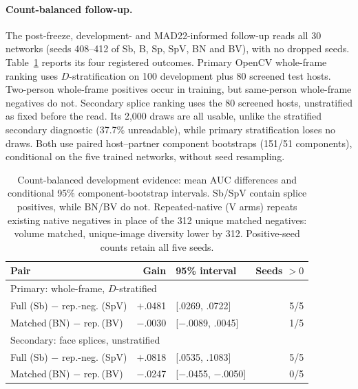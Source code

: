     
    \paragraph{Count-balanced follow-up.}
    The post-freeze, development- and MAD22-informed follow-up reads all 30 networks (seeds 408--412 of Sb, B, Sp, SpV, BN and BV), with no dropped seeds. Table~\ref{tab:count_balanced} reports its four registered outcomes. Primary OpenCV whole-frame ranking uses $D$-stratification on 100 development plus 80 screened test hosts. Two-person whole-frame positives occur in training, but same-person whole-frame negatives do not. Secondary splice ranking uses the 80 screened hosts, unstratified as fixed before the read. Its 2,000 draws are all usable, unlike the stratified secondary diagnostic (37.7\% unreadable), while primary stratification loses no draws. Both use paired host--partner component bootstraps (151/51 components), conditional on the five trained networks, without seed resampling.
    
    \begin{table}[t]
    \centering\small
    \caption{Count-balanced development evidence: mean AUC differences and conditional 95\% component-bootstrap intervals. Sb/SpV contain splice positives, while BN/BV do not. Repeated-native (V arms) repeats existing native negatives in place of the 312 unique matched negatives: volume matched, unique-image diversity lower by 312. Positive-seed counts retain all five seeds.}
    \label{tab:count_balanced}
    \footnotesize
    \begin{tabular}{@{}p{1.28in}rp{0.95in}r@{}}
    \toprule
    Pair & Gain & 95\% interval & Seeds $>0$ \\
    \midrule
    \multicolumn{4}{l}{Primary: whole-frame, $D$-stratified} \\
    Full (Sb) $-$ rep.-neg. (SpV) & $+$.0481 & [.0269, .0722] & 5/5 \\
    Matched\,(BN) $-$ rep.\,(BV) & $-$.0030 & [$-$.0089, .0045] & 1/5 \\
    \midrule
    \multicolumn{4}{l}{Secondary: face splices, unstratified} \\
    Full (Sb) $-$ rep.-neg. (SpV) & $+$.0818 & [.0535, .1083] & 5/5 \\
    Matched\,(BN) $-$ rep.\,(BV) & $-$.0247 & [$-$.0455, $-$.0050] & 0/5 \\
    \bottomrule
    \end{tabular}
    \end{table}
    
